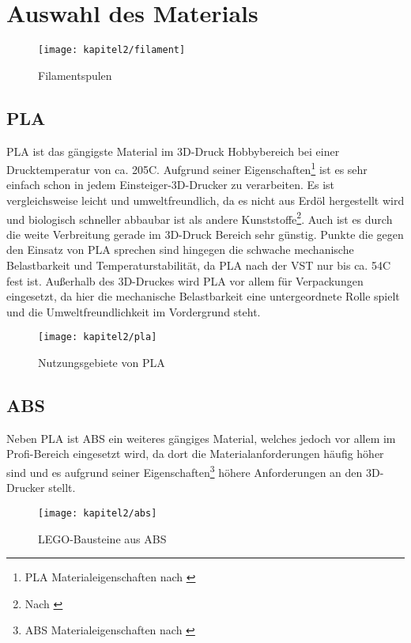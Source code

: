 \chapter{Auswahl des Materials}

\begin{figure}[h]
  \centering
  \texttt{[image: kapitel2/filament]}
  \caption{Filamentspulen}
  \label{Kap2:Filament}
\end{figure}

\section{PLA}
\ac{PLA} ist das gängigste Material im 3D-Druck Hobbybereich bei einer Drucktemperatur von ca. 205\degree C. Aufgrund seiner Eigenschaften\footnote{PLA Materialeigenschaften nach \cite{ulPLA}} ist es sehr einfach schon in jedem Einsteiger-3D-Drucker zu verarbeiten. Es ist vergleichsweise leicht und umweltfreundlich, da es nicht aus Erdöl hergestellt wird und biologisch schneller abbaubar ist als andere Kunststoffe\footnote{Nach \cite{10093722}}. Auch ist es durch die weite Verbreitung gerade im 3D-Druck Bereich sehr günstig.
Punkte die gegen den Einsatz von \ac{PLA} sprechen sind hingegen die schwache mechanische Belastbarkeit und Temperaturstabilität, da \ac{PLA} nach der \ac{VST} nur bis ca. 54\degree C fest ist. Außerhalb des 3D-Druckes wird \ac{PLA} vor allem für Verpackungen eingesetzt, da hier die mechanische Belastbarkeit eine untergeordnete Rolle spielt und die Umweltfreundlichkeit im Vordergrund steht.

\begin{figure}[h]
  \centering
  \texttt{[image: kapitel2/pla]}
  \caption{Nutzungsgebiete von PLA}
  \label{Kap2:PLAEinsatz}
\end{figure}

\section{ABS}
Neben \ac{PLA} ist \ac{ABS} ein weiteres gängiges Material, welches jedoch vor allem im Profi-Bereich eingesetzt wird, da dort die Materialanforderungen häufig höher sind und es aufgrund seiner Eigenschaften\footnote{ABS Materialeigenschaften nach \cite{ulABS}} höhere Anforderungen an den 3D-Drucker stellt.

\TODO

\begin{figure}[h]
  \centering
  \texttt{[image: kapitel2/abs]}
  \caption{LEGO-Bausteine aus ABS}
  \label{Kap2:ABSLego}
\end{figure}